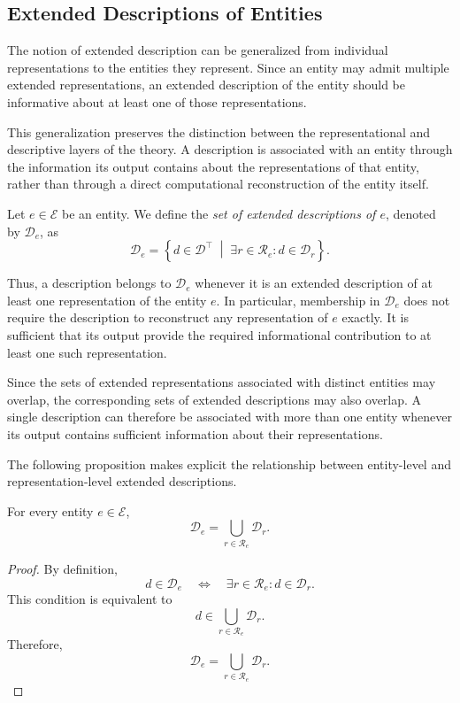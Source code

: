 
\subsection*{Extended Descriptions of Entities}

The notion of extended description can be generalized from individual representations to the entities they represent. Since an entity may admit multiple extended representations, an extended description of the entity should be informative about at least one of those representations.

This generalization preserves the distinction between the representational and descriptive layers of the theory. A description is associated with an entity through the information its output contains about the representations of that entity, rather than through a direct computational reconstruction of the entity itself.

\begin{definition}
\label{def:extended_descriptions_for_entity}
Let $e\in\mathcal{E}$ be an entity. We define the \emph{set of extended descriptions of $e$}, denoted by $\mathcal{D}_e$, as
\[
\mathcal{D}_e = \left\{d\in\mathcal{D}^\top\;\middle|\;\exists r\in\mathcal{R}_e: d\in\mathcal{D}_r \right\}.
\]
\end{definition}

Thus, a description belongs to $\mathcal{D}_e$ whenever it is an extended description of at least one representation of the entity $e$. In particular, membership in $\mathcal{D}_e$ does not require the description to reconstruct any representation of $e$ exactly. It is sufficient that its output provide the required informational contribution to at least one such representation.

Since the sets of extended representations associated with distinct entities may overlap, the corresponding sets of extended descriptions may also overlap. A single description can therefore be associated with more than one entity whenever its output contains sufficient information about their representations.

The following proposition makes explicit the relationship between entity-level and representation-level extended descriptions.

\begin{proposition}
\label{prop:extended_descriptions_entity_union}
For every entity $e\in\mathcal{E}$,
\[
\mathcal{D}_e = \bigcup_{r\in\mathcal{R}_e} \mathcal{D}_r.
\]
\end{proposition}
\begin{proof}
By definition,
\[
d\in\mathcal{D}_e \quad\Longleftrightarrow\quad \exists r\in\mathcal{R}_e: d\in\mathcal{D}_r.
\]
This condition is equivalent to
\[
d\in \bigcup_{r\in\mathcal{R}_e} \mathcal{D}_r.
\]
Therefore,
\[
\mathcal{D}_e = \bigcup_{r\in\mathcal{R}_e} \mathcal{D}_r.
\]
\end{proof}

